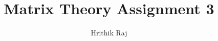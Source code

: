 \documentclass[journal,12pt,twocolumn]{IEEEtran}
\begin{document}
\makeatletter
{}
\makeatother
\let\StandardTheFigure\thefigure
\let\vec\mathbf
\renewcommand{\thefigure}{\theproblem}
\def\putbox#1#2#3{\makebox[0in][l]{\makebox[#1][l]{}\raisebox{\baselineskip}[0in][0in]{\raisebox{#2}[0in][0in]{#3}}}}
     \def\rightbox#1{\makebox[0in][r]{#1}}
     \def\centbox#1{\makebox[0in]{#1}}
     \def\topbox#1{\raisebox{-\baselineskip}[0in][0in]{#1}}
     \def\midbox#1{\raisebox{-0.5\baselineskip}[0in][0in]{#1}}
\vspace{3cm}
\title{Matrix Theory Assignment 3}
\author{Hrithik Raj}
%
%
%
% 
%
\end{document}
